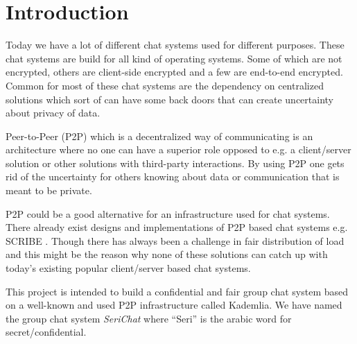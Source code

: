 \chapter{Introduction}\label{cha:introduction}
Today we have a lot of different chat systems used for different purposes. These chat systems are build for all kind of operating systems. 
Some of which are not encrypted, others are client-side encrypted and a few are end-to-end encrypted. Common for most of these chat systems are the dependency on centralized solutions which sort of can have some back doors that can create uncertainty about privacy of data. 

Peer-to-Peer (P2P) which is a decentralized way of communicating \cite{androutsellis2004survey} is an architecture where no one can have a superior role opposed to e.g. a client/server solution or other solutions with third-party interactions. By using P2P one gets rid of the uncertainty for others knowing about data or communication that is meant to be private. 

P2P could be a good alternative for an infrastructure used for chat systems. There already exist designs and implementations of P2P based chat systems e.g. SCRIBE \cite{castro2002scribe}. Though there has always been a challenge in fair distribution of load and this might be the reason why none of these solutions can catch up with today's existing popular client/server based chat systems.  

This project is intended to build a confidential and fair group chat system based on a well-known and used P2P infrastructure called Kademlia. We have named the group chat system \emph{SeriChat} where ``Seri'' is the arabic word for secret/confidential. 

